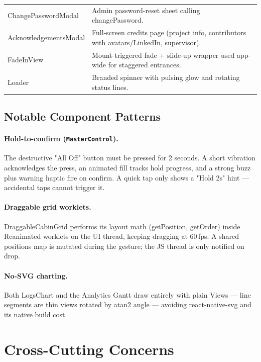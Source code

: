 \documentclass[11pt,a4paper]{article}
\newcommand{\code}[1]{\colorbox{codebg}{\ttfamily\small #1}}
\begin{document}
\begin{longtable}{@{}p{}p{}@{}}
  \code{ChangePasswordModal} & Admin password-reset sheet calling
                          \code{changePassword}. \\
  \code{AcknowledgementsModal} & Full-screen credits page (project info,
                          contributors with avatars/LinkedIn, supervisor). \\
  \code{FadeInView}     & Mount-triggered fade + slide-up wrapper used app-wide
                          for staggered entrances. \\
  \code{Loader}         & Branded spinner with pulsing glow and rotating
                          status lines. \\
  \bottomrule
\end{longtable}

\subsection{Notable Component Patterns}

\paragraph{Hold-to-confirm (\texttt{MasterControl}).} The destructive "All Off"
button must be pressed for 2 seconds. A short vibration acknowledges the press,
an animated fill tracks hold progress, and a strong buzz plus warning haptic
fire on confirm. A quick tap only shows a "Hold 2s" hint — accidental taps
cannot trigger it.

\paragraph{Draggable grid worklets.} \code{DraggableCabinGrid} performs its
layout math (\code{getPosition}, \code{getOrder}) inside Reanimated worklets on
the UI thread, keeping dragging at 60\,fps. A shared \code{positions} map is
mutated during the gesture; the JS thread is only notified on drop.

\paragraph{No-SVG charting.} Both \code{LogsChart} and the Analytics Gantt draw
entirely with plain \code{View}s — line segments are thin views rotated by
\code{atan2} angle — avoiding \code{react-native-svg} and its native build cost.

\section{Cross-Cutting Concerns}
\end{document}
